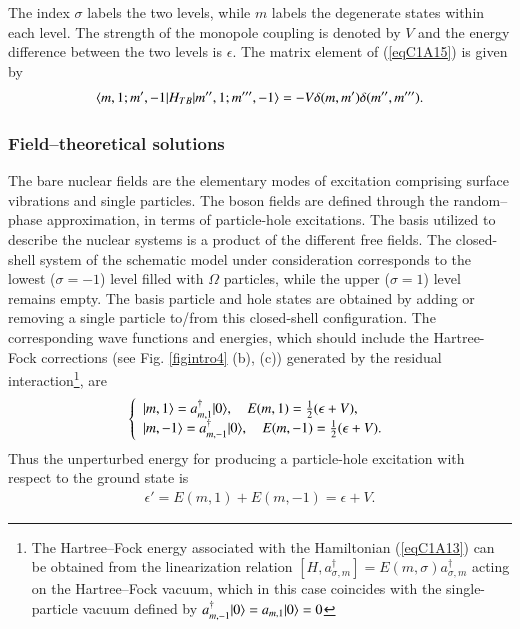 The index $\sigma$ labels the two levels, while $m$ labels the degenerate states within
each level. The strength of the monopole coupling is denoted by $V$ and the
energy difference between the two levels is $\epsilon$. 
The matrix element of (\ref{eqC1A15}) is given by
\begin{align}\label{eqC1A16} 
\langle {m,1;m',-1|H_{TB}|m'',1;m''',-1} \rangle=-V\delta(m,m')\delta(m'',m''').
\end{align}
\subsubsection{Field--theoretical solutions}
 The bare nuclear  fields are
the elementary modes of excitation comprising surface vibrations and single
particles. The boson fields are defined through the random--phase
approximation, in terms of particle-hole excitations. The basis utilized to
describe the nuclear systems is a product of the different free fields. 
The closed-shell system of the schematic model under consideration corresponds to the lowest ($\sigma = - 1$) level filled with $\Omega$ particles, while the upper
($\sigma =  1$) level remains empty. The basis particle and hole states are obtained
by adding or removing a single particle to/from this closed-shell configuration.
The corresponding wave functions and energies, which should include the
Hartree-Fock corrections (see Fig. \ref{figintro4} (b), (c)) generated by the residual interaction\footnote{The Hartree--Fock energy associated with the Hamiltonian (\ref{eqC1A13}) can be obtained
from the linearization relation $[H,a_{\sigma,m}^\dagger]=E(m,\sigma)a^\dagger_{\sigma,m}$ acting on the Hartree--Fock
vacuum, which in this case coincides with the single-particle vacuum defined by
 $a^\dagger_{m,-1}|{0} \rangle=a_{m,1}|{0} \rangle=0$}, are
 \begin{align}\label{eqC1A17} 
\left\{\begin{array}{l}
 |{m,1} \rangle=a^\dagger_{m,1}|{0} \rangle,\quad E(m,1)=\frac{1}{2}(\epsilon+V),\\ 
|{m,-1} \rangle=a^\dagger_{m,-1}|{0} \rangle,\quad E(m,-1)=\frac{1}{2}(\epsilon+V).
\end{array} \right.
 \end{align}
Thus the unperturbed energy for producing a particle-hole excitation with
respect to the ground state is
 \begin{align}\label{eqC1A18} 
\epsilon'=E(m,1)+E(m,-1)=\epsilon+V.
 \end{align}

